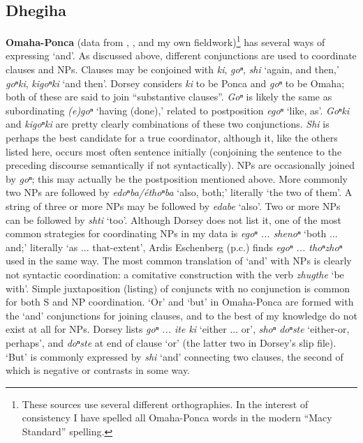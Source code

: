 \documentclass[output=paper]{LSP/langsci}
\begin{document}
\subsection{Dhegiha}
 
\textbf{Omaha-Ponca} (data from \citealt{DorseyNDPonka} \citealt{DorseyNDOmahaPonca},  \citealt{Koontz1984}, \citealt{Rudin2003} and my own fieldwork)\footnote{These sources use several different orthographies. In the interest of consistency I have spelled all Omaha-Ponca words in the modern ``Macy Standard'' spelling.} has several ways of expressing `and'. As discussed above, different conjunctions are used to coordinate clauses and NPs. Clauses may be conjoined with \textit{ki}, \textit{goⁿ}, \textit{shi} `again, and then,' \textit{goⁿki}, \textit{kigoⁿki} `and then'. Dorsey considers \textit{ki} to be Ponca and \textit{goⁿ} to be Omaha; both of these are said to join ``substantive clauses''. \textit{Goⁿ} is likely the same as subordinating \textit{(e)goⁿ} `having (done),' related to postposition \textit{egoⁿ} `like, as'. \textit{Goⁿki} and \textit{kigoⁿki} are pretty clearly combinations of these two conjunctions. \textit{Shi} is perhaps the best candidate for a true coordinator, although it, like the others listed here, occurs most often sentence initially (conjoining the sentence to the preceding discourse semantically if not syntactically). NPs are occasionally joined by \textit{goⁿ}; this may actually be the postposition mentioned above. More commonly two NPs are followed by \textit{edoⁿba/éthoⁿba} `also, both;' literally `the two of them'. A string of three or more NPs may be followed by \textit{edabe} `also'. Two or more NPs can be followed by \textit{shti} `too'. Although Dorsey does not list it, one of the most common strategies for coordinating NPs in my data is \textit{egoⁿ ... shenoⁿ} `both ... and;' literally `as ... that-extent', Ardis Eschenberg (p.c.) finds \textit{egoⁿ ... thoⁿzhoⁿ} used in the same way. The most common translation of `and' with NPs is clearly not syntactic coordination: a comitative construction with the verb \textit{zhugthe} `be with'. Simple juxtaposition (listing) of conjuncts with no conjunction is common for both S and NP coordination. `Or' and `but' in Omaha-Ponca are formed with the `and' conjunctions for joining clauses, and to the best of my knowledge do not exist at all for NPs. Dorsey lists \textit{goⁿ ... ite ki} `either ... or', \textit{shoⁿ doⁿste} `either-or, perhaps', and \textit{doⁿste} at end of clause `or' (the latter two in Dorsey's slip file). `But' is commonly expressed by \textit{shi} `and' connecting two clauses, the second of which is negative or contrasts in some way.
\end{document}
